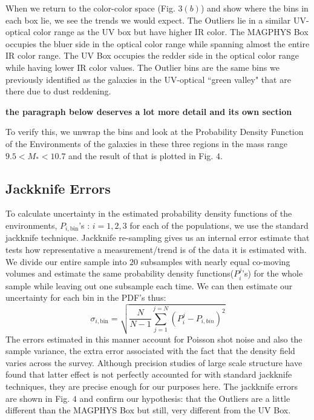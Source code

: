 \documentclass[iop]{emulateapj}
\begin{document}
When we return to the color-color space (Fig. $3(b)$) and show
where the bins in each box lie,  we see the trends we would expect. 
The Outliers  lie in a similar UV-optical color range as the UV box 
but have higher IR color. The MAGPHYS Box occupies the bluer side 
in the optical color range while spanning almost the entire IR color range. 
The UV Box occupies the redder side in the optical color range while 
having lower IR color values. The Outlier bins are the 
same bins we previously identified as the galaxies in 
the UV-optical ``green valley" that are there due to dust reddening. 

\textbf{the paragraph below deserves a lot more detail and its own section}

To verify this, we unwrap the bins and look at the Probability 
Density Function of the Environments of the galaxies in these three regions in the mass range  $ 9.5 < M_{*} < 10.7$ and the result of that is plotted in Fig. $4$.

\subsection{Jackknife Errors}

To calculate uncertainty in the estimated probability density 
functions of the environments, $P_{i,\mathrm{bin}}$'s : 
$i = 1,2,3$ for each of the populations, we use the standard 
jackknife technique. Jackknife re-sampling gives us an internal 
error estimate that tests how representative a measurement/trend 
is of the data it is estimated with. We divide our entire 
sample into $20$ subsamples with nearly equal co-moving 
volumes and estimate the same probability density 
functions($P^{j}_{i}$'s) for the whole sample while leaving 
out one subsample each time. We can then estimate our uncertainty 
for each bin in the PDF's thus:
$$ \sigma_{i, \mathrm{bin}} = \sqrt{\frac{N}{N-1} \sum_{j = 1}^{j = N} (P^{j}_{i} - P_{i,bin})^{2}} $$
The errors estimated in this manner account for Poisson shot
noise and also the sample variance, the extra error associated
with the fact that the density field varies across the survey. 
Although precision studies of large scale structure have found
that latter effect is not perfectly accounted for with standard
jackknife techniques, they are precise enough for our purposes
here. The jackknife errors are shown in Fig. $4$ and confirm our 
hypothesis: that the Outliers are a little different than the 
MAGPHYS Box but still, very different from the UV Box.
\end{document}
